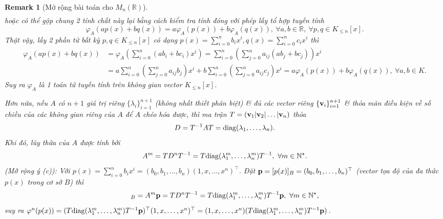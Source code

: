 \documentclass{article}
\newtheorem{remark}{Remark}
\begin{document}
\begin{remark}[Mở rộng bài toán cho $M_n(\mathbb{R})$]
\begin{align*}
	\end{align*}
	hoặc có thể gộp chung 2 tính chất này lại bằng cách kiểm tra tính đóng với phép lấy tổ hợp tuyến tính
	\begin{equation*}
		\varphi_A(ap(x) + bq(x)) = a\varphi_A(p(x)) + b\varphi_A(q(x)),\ \forall a,b\in\mathbb{R},\ \forall p,q\in K_{\le n}[x].
	\end{equation*}
	Thật vậy, lấy 2 phần tử bất kỳ $p,q\in K_{\le n}[x]$ có dạng $p(x) = \sum_{i=0}^n b_ix^i,q(x) = \sum_{i=0}^n c_ix^i$ thì
	\begin{align*}
		\varphi_A(ap(x) + bq(x)) &= \varphi_A\left(\sum_{i=0}^n (ab_i + bc_i)x^i\right) = \sum_{i=0}^n\left(\sum_{j=0}^n a_{ij}(ab_j + bc_j)\right)x^i\\
		&= a\sum_{i=0}^n \left(\sum_{j=0}^n a_{ij}b_j\right)x^i + b\sum_{i=0}^n \left(\sum_{j=0}^n a_{ij}c_j\right)x^i = a\varphi_A(p(x)) + b\varphi_A(q(x)),\ \forall a,b\in K.
	\end{align*}
	Suy ra $\varphi_A$ là 1 toán tử tuyến tính trên không gian vector $K_{\le n}[x]$.	
	
	Hơn nữa, nếu $A$ có $n + 1$ giá trị riêng $\{\lambda_i\}_{i=1}^{n+1}$ (không nhất thiết phân biệt) \& đủ các vector riêng $\{{\bf v}_i\}_{i=1}^{n+1}$ \& thỏa mãn điều kiện về số chiều của các không gian riêng của $A$ để $A$ chéo hóa được, thì ma trận $T = ({\bf v}_1|{\bf v}_2|\ldots|{\bf v}_n)$ thỏa
	\begin{equation*}
		D = T^{-1}AT = {\rm diag}(\lambda_1,\ldots,\lambda_n).
	\end{equation*}
	Khi đó, lũy thừa của $A$ được tính bởi
	\begin{equation*}
		A^m = TD^nT^{-1} = T{\rm diag}(\lambda_1^m,\ldots,\lambda_n^m)T^{-1},\ \forall m\in\mathbb{N}^\star.
	\end{equation*}	
	{\rm(Mở rộng ý (c)):} Với $p(x) = \sum_{i=0}^n b_ix^i = (b_0,b_1,\ldots,b_n)(1,x,\ldots,x^n)^\top$. Đặt ${\bf p} = [p(x)]_B = (b_0,b_1,\ldots,b_n)^\top$ (vector tọa độ của đa thức $p(x)$ trong cơ sở $B$) thì
	\begin{equation*}
		[\varphi^m(p(x))]_B = A^m{\bf p} = TD^nT^{-1} = T{\rm diag}(\lambda_1^m,\ldots,\lambda_n^m)T^{-1}{\bf p},\ \forall m\in\mathbb{N}^\star,
	\end{equation*}
	suy ra $\varphi^n(p(x)) = (T{\rm diag}(\lambda_1^m,\ldots,\lambda_n^m)T^{-1}{\bf p})^\top(1,x,\ldots,x^n)^\top = (1,x,\ldots,x^n)(T{\rm diag}(\lambda_1^m,\ldots,\lambda_n^m)T^{-1}{\bf p})$.
\end{remark}

\end{document}
